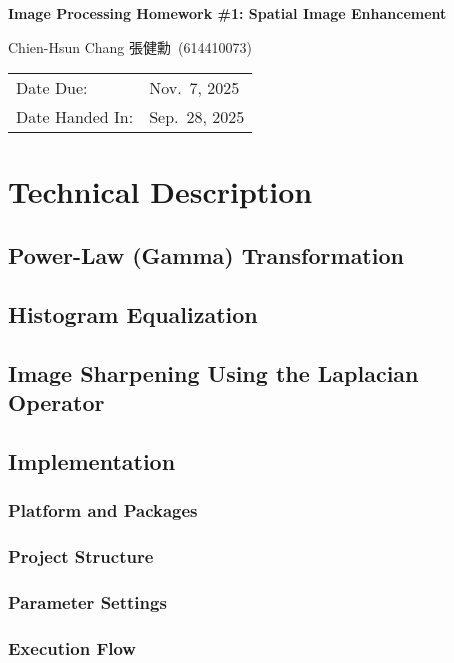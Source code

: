 \documentclass[12pt,a4paper]{article}
\newcommand{\HomeworkTitle}{Image Processing Homework \#1: Spatial Image Enhancement}
\newcommand{\StudentName}{Chien-Hsun Chang 張健勳}
\newcommand{\StudentID}{614410073}
\newcommand{\StudentInfo}{\StudentName~(\StudentID)}
\newcommand{\DateDue}{Nov.\ 7, 2025}
\newcommand{\DateHandedIn}{Sep.\ 28, 2025}
\begin{document}
\begin{titlepage} %
	\centering
	{\vspace*{2cm}\Huge\bfseries \HomeworkTitle\par}
	\vspace{2cm}
    {\Large \StudentInfo\par}
	\vfill
	\begin{tabular}{ll}
		Date Due: & {\DateDue} \\
		Date Handed In: & {\DateHandedIn} \\
	\end{tabular}
	\vfill
\end{titlepage}

\section{Technical Description} %
\subsection{Power-Law (Gamma) Transformation} %
\subsection{Histogram Equalization} %
\subsection{Image Sharpening Using the Laplacian Operator} %
\subsection{Implementation} %
\subsubsection{Platform and Packages} %
\subsubsection{Project Structure} %
\subsubsection{Parameter Settings} %
\subsubsection{Execution Flow} %
\end{document}
